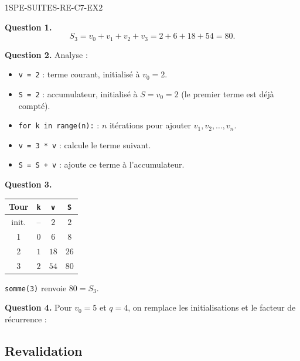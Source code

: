 \begin{corrige}{1SPE-SUITES-RE-C7-EX2}

\textbf{Question 1.}
\[
S_3 = v_0 + v_1 + v_2 + v_3 = 2 + 6 + 18 + 54 = 80.
\]

\textbf{Question 2.} Analyse :
\begin{itemize}
  \item \texttt{v = 2} : terme courant, initialisé à $v_0 = 2$.
  \item \texttt{S = 2} : accumulateur, initialisé à $S = v_0 = 2$ (le premier terme est déjà compté).
  \item \texttt{for k in range(n):} : $n$ itérations pour ajouter $v_1, v_2, \ldots, v_n$.
  \item \texttt{v = 3 * v} : calcule le terme suivant.
  \item \texttt{S = S + v} : ajoute ce terme à l'accumulateur.
\end{itemize}


\textbf{Question 3.}

\begin{center}
\begin{tabular}{|c|c|c|c|}
\hline
Tour & \texttt{k} & \texttt{v} & \texttt{S} \\
\hline
init. & -- & $2$ & $2$ \\
1 & $0$ & $6$ & $8$ \\
2 & $1$ & $18$ & $26$ \\
3 & $2$ & $54$ & $80$ \\
\hline
\end{tabular}
\end{center}

\texttt{somme(3)} renvoie $80 = S_3$. \checkmark

\textbf{Question 4.} Pour $v_0 = 5$ et $q = 4$, on remplace les initialisations et le facteur de récurrence :

\medskip


\end{corrige}

\subsection*{Revalidation}


